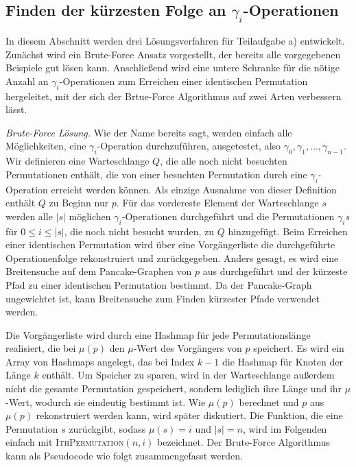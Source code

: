 \documentclass[a4paper, 11pt, ngerman]{article}
\begin{document}
\subsection{Finden der kürzesten Folge an $\gamma_i$-Operationen}

In diesem Abschnitt werden drei Lösungsverfahren für Teilaufgabe a) entwickelt. Zunächst wird ein Brute-Force Ansatz vorgestellt, der bereits alle vorgegebenen Beispiele gut lösen kann. Anschließend wird eine untere Schranke für die nötige Anzahl an $\gamma_i$-Operationen zum Erreichen einer identischen Permutation hergeleitet, mit der sich der Brtue-Force Algorithmus auf zwei Arten verbessern lässt.
\bigskip

\noindent \emph{Brute-Force Lösung.} Wie der Name bereits sagt, werden einfach alle Möglichkeiten, eine $\gamma_i$-Operation durchzuführen, ausgetestet, also $\gamma_0, \gamma_1, \dots, \gamma_{n-1}$. Wir definieren eine Warteschlange $Q$, die alle noch nicht besuchten Permutationen enthält, die von einer besuchten Permutation durch eine $\gamma_i$-Operation erreicht werden können. Als einzige Ausnahme von dieser Definition enthält $Q$ zu Beginn nur $p$. Für das vordereste Element der Warteschlange $s$ werden alle $|s|$ möglichen $\gamma_i$-Operationen durchgeführt und die Permutationen $\gamma_i s$ für $0 \le i \le |s|$, die noch nicht besucht wurden, zu $Q$ hinzugefügt. Beim Erreichen einer identischen Permutation wird über eine Vorgängerliste die durchgeführte Operationenfolge rekonstruiert und zurückgegeben. Anders gesagt, es wird eine Breitensuche auf dem Pancake-Graphen von $p$ aus durchgeführt und der kürzeste Pfad zu einer identischen Permutation bestimmt. Da der Pancake-Graph ungewichtet ist, kann Breitensuche zum Finden kürzester Pfade verwendet werden.

Die Vorgängerliste wird durch eine Hashmap für jede Permutationslänge realisiert, die bei $\mu(p)$ den $\mu$-Wert des Vorgängers von $p$ speichert. Es wird ein Array von Hashmaps angelegt, das bei Index $k - 1$ die Hashmap für Knoten der Länge $k$ enthält. Um Speicher zu sparen, wird in der Warteschlange außerdem nicht die gesamte Permutation gespeichert, sondern lediglich ihre Länge und ihr $\mu$-Wert, wodurch sie eindeutig bestimmt ist. Wie $\mu(p)$ berechnet und $p$ aus $\mu(p)$ rekonstruiert werden kann, wird später diskutiert. Die Funktion, die eine Permutation $s$ zurückgibt, sodass $\mu(s) = i$ und $|s| = n$, wird im Folgenden einfach mit \textsc{IthPermutation}$(n, i)$ bezeichnet. Der Brute-Force Algorithmus kann als Pseudocode wie folgt zusammengefasst werden.
\end{document}

